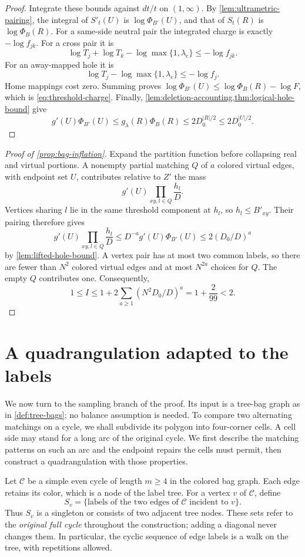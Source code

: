\documentclass[11pt]{article}
\theoremstyle{definition}
\theoremstyle{remark}
\numberwithin{equation}{section}
\begin{document}
\begin{proof}
Integrate these bounds against $dt/t$ on $(1,\infty)$. By
\cref{lem:ultrametric-pairing}, the integral of $S'_t(U)$ is
$\log\Phi_{B'}(U)$, and that of $S_t(R)$ is $\log\Phi_B(R)$.
For a same-side neutral pair the integrated charge is exactly
$-\log f_{jk}$. For a cross pair it is
\[
 \log T_j+\log T_k-\log\max\{1,\lambda_e\}
 \le-\log f_{jk}.
\]
For an away-mapped hole it is
\[
 \log T_j-\log\max\{1,\lambda_e\}\le-\log f_j.
\]
Home mappings cost zero. Summing proves
$\log\Phi_{B'}(U)\le\log\Phi_B(R)-\log F$,
which is \cref{eq:threshold-charge}. Finally,
\cref{lem:deletion-accounting,thm:logical-hole-bound} give
\[
 g'(U)\Phi_{B'}(U)
 \le g_\lambda(R)\Phi_B(R)
 \le2D_0^{|R|/2}
 \le2D_0^{|U|/2}.
\]
\end{proof}

\begin{proof}[Proof of \cref{prop:bag-inflation}]
Expand the partition function before collapsing real and virtual
portions. A nonempty partial matching $Q$ of $a$ colored virtual
edges, with endpoint set $U$, contributes relative to $Z'$ the mass
\[
 g'(U)\prod_{xy,l\in Q}\frac{h_l}{D}.
\]
Vertices sharing $l$ lie in the same threshold component at $h_l$,
so $h_l\le B'_{xy}$. Their pairing therefore gives
\[
 g'(U)\prod_{xy,l\in Q}\frac{h_l}{D}
 \le D^{-a}g'(U)\Phi_{B'}(U)
 \le2(D_0/D)^a
\]
by \cref{lem:lifted-hole-bound}. A vertex pair has at most two
common labels, so there are fewer than $N^2$ colored virtual edges
and at most $N^{2a}$ choices for $Q$. The empty $Q$ contributes one.
Consequently,
\[
 1\le I\le1+2\sum_{a\ge1}(N^2D_0/D)^a
 =1+\frac2{99}<2.
\]

\end{proof}

\section{A quadrangulation adapted to the labels}
\label{sec:cells}

We now turn to the sampling branch of the proof. Its input is a
tree-bag graph as in \cref{def:tree-bags}; no balance assumption is
needed. To compare two alternating matchings on a cycle, we shall
subdivide its polygon into four-corner cells. A cell side may stand
for a long arc of the original cycle. We first describe the matching
patterns on such an arc and the endpoint repairs the cells must
permit, then construct a quadrangulation with those properties.

Let $\mathcal C$ be a simple even cycle of length $m\ge4$ in the colored
bag graph.  Each edge retains its color, which is a node of the label
tree.  For a vertex $v$ of $\mathcal C$, define
\[
 S_v=\{\text{labels of the two edges of $\mathcal C$ incident to $v$}\}.
\]
Thus $S_v$ is a singleton or consists of two adjacent tree nodes.
These sets refer to the \emph{original full cycle} throughout the
construction; adding a diagonal never changes them.  In particular,
the cyclic sequence of edge labels is a walk on the tree, with repetitions
allowed.
\end{document}
